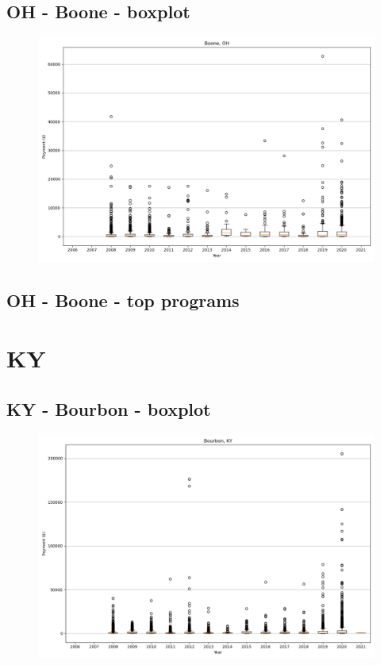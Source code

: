 \subsection*{OH - Boone - boxplot}
\begin{figure}[h]
\centering
\includegraphics[width=7in]{../output/boxplots/counties/Boone-OH_boxplot.png}
\end{figure}


\subsection*{OH - Boone - top programs}

\newpage
\section*{KY}
\subsection*{KY - Bourbon - boxplot}
\begin{figure}[h]
\centering
\includegraphics[width=7in]{../output/boxplots/counties/Bourbon-KY_boxplot.png}
\end{figure}


